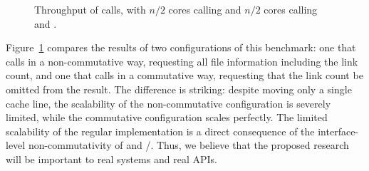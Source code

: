 \begin{figure}
  \centering
  
  \caption{Throughput of  calls, with $n/2$ cores calling
     and $n/2$ cores calling  and
    .}
  \label{fig:linkbench}
\end{figure}

Figure~\ref{fig:linkbench} compares the results of two configurations
of this benchmark: one that calls  in a non-commutative
way, requesting all file information including the link count, and one
that calls  in a commutative way, requesting that the
link count be omitted from the result.  The difference is striking:
despite moving only a single cache line, the scalability of the
non-commutative configuration is severely limited, while the
commutative configuration scales perfectly.  The limited scalability
of the regular  implementation is a direct consequence
of the interface-level non-commutativity of  and
/.  Thus, we
believe that the proposed research will be important to real systems
and real APIs.



